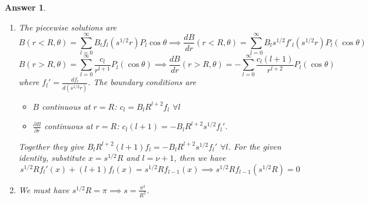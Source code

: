 \documentclass[a4paper]{article}
\newtheorem{ans}{Answer}[section]
\theoremstyle{new}
\begin{document}
\begin{ans}
\begin{enumerate}[label=(\roman*)]
\begin{eqnarray}
\end{eqnarray}
where we used again the hint in part (i). Hence this requires $f_l(s^{1/2}r)$ to satisfy the given equation.
\item The piecewise solutions are
$$B(r<R,\theta)=\sum_{l=0}^\infty B_lf_l(s^{1/2}r)P_l\cos\theta\implies\frac{dB}{dr}(r<R,\theta)=\sum_{l=0}^\infty B_ls^{1/2}f'_l(s^{1/2}r)P_l(\cos\theta)$$
$$B(r>R,\theta)=\sum_{l=0}^\infty\frac{c_l}{r^{l+1}}P_l(\cos\theta)\implies\frac{dB}{dr}(r>R,\theta)=-\sum_{l=0}^\infty\frac{c_l(l+1)}{r^{l+2}}P_l(\cos\theta)$$
where $f_l'=\frac{df_l}{d(s^{1/2}r)}$. The boundary conditions are
\begin{itemize}
    \item $B$ continuous at $r=R$: $c_l=B_lR^{l+2}f_l$ $\forall l$
    \item $\frac{\partial B}{\partial r}$ continuous at $r=R$: $c_l(l+1)=-B_lR^{l+2}s^{1/2}f_l'$. 
\end{itemize}
Together they give $B_lR^{l+2}(l+1)f_l=-B_lR^{l+2}s^{1/2}f_l'$ $\forall l$. For the given identity, substitute $x=s^{1/2}R$ and $l=\nu+1$, then we have
$$s^{1/2}Rf_l'(x)+(l+1)f_l(x)=s^{1/2}Rf_{l-1}(x)\implies s^{1/2}Rf_{l-1}(s^{1/2}R)=0$$
\item We must have $s^{1/2}R=\pi\implies s=\frac{\pi^2}{R^2}$.
\end{enumerate}
\end{ans}
\newpage
\end{document}
